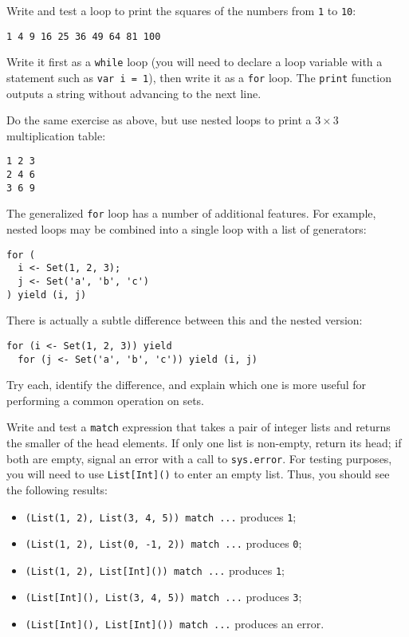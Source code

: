 \begin{exercises}
\item Write and test a loop to print the squares of the numbers from \texttt{1} to \texttt{10}:
\begin{center}
\texttt{1 4 9 16 25 36 49 64 81 100}
\end{center}
Write it first as a \texttt{while} loop (you will need to declare a loop variable with a statement such as \verb|var i = 1|), then write it as a \texttt{for} loop. The \texttt{print} function outputs a string without advancing to the next line.

\item Do the same exercise as above, but use nested loops to print a $3\times 3$ multiplication table:
\begin{center}
\texttt{1 2 3}\\
\texttt{2 4 6}\\
\texttt{3 6 9}
\end{center}

\item The generalized \texttt{for} loop has a number of additional features. For example, nested loops may be combined into a single loop with a list of generators:
\begin{verbatim}
for (
  i <- Set(1, 2, 3);
  j <- Set('a', 'b', 'c')
) yield (i, j)
\end{verbatim}
There is actually a subtle difference between this and the nested version:
\begin{verbatim}
for (i <- Set(1, 2, 3)) yield
  for (j <- Set('a', 'b', 'c')) yield (i, j)
\end{verbatim}
Try each, identify the difference, and explain which one is more useful for performing a common operation on sets.

\item Write and test a \texttt{match} expression that takes a pair of integer lists and returns the smaller of the head elements. If only one list is non-empty, return its head; if both are empty, signal an error with a call to \texttt{sys.error}. For testing purposes, you will need to use \verb|List[Int]()| to enter an empty list. Thus, you should see the following results:
\begin{itemize}
\item \verb|(List(1, 2), List(3, 4, 5)) match ...| produces \texttt{1};
\item \verb|(List(1, 2), List(0, -1, 2)) match ...| produces \texttt{0};
\item \verb|(List(1, 2), List[Int]()) match ...| produces \texttt{1};
\item \verb|(List[Int](), List(3, 4, 5)) match ...| produces \texttt{3};
\item \verb|(List[Int](), List[Int]()) match ...| produces an error.
\end{itemize} 
\end{exercises}

